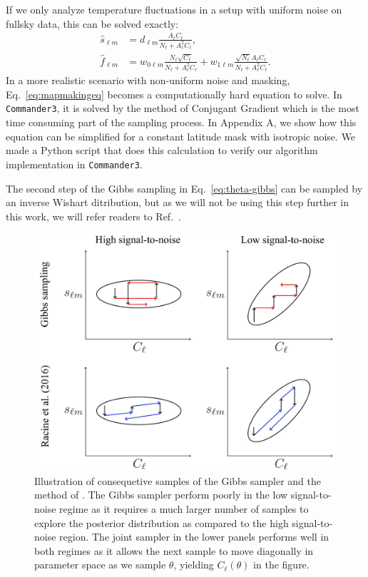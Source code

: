 \documentclass[twocolumn]{../common/aa}
\def\commanderthree{\texttt{Commander3}}
\begin{document}
If we only analyze temperature fluctuations in a setup with uniform noise on fullsky data, this can be solved exactly:
\begin{align}
    \hat{s}_{\ell m} &= d_{\ell m}\frac{A_{\ell}C_{\ell}}{N_\ell + A_{\ell}^2C_{\ell}},\\
    \hat{f}_{\ell m} &= w_{0\ell m}\frac{N_{\ell}\sqrt{C_{\ell}}}{N_\ell + A_{\ell}^2C_{\ell}}+w_{1\ell m}\frac{\sqrt{N_{\ell}}A_{\ell}C_\ell}{N_\ell + A_{\ell}^2C_{\ell}}.
\end{align}
In a more realistic scenario with non-uniform noise and masking, Eq.~\eqref{eq:mapmakingeq} becomes a computationally hard equation to solve. In \commanderthree, it is solved by the method of Conjugant Gradient which is the most time consuming part of the sampling process. In Appendix A, we show how this equation can be simplified for a constant latitude mask with isotropic noise. We made a Python script that does this calculation to verify our algorithm implementation in \commanderthree.

The second step of the Gibbs sampling in Eq.~\eqref{eq:theta-gibbs} can be sampled by an inverse Wishart ditribution, but as we will not be using this step further in this work, we will refer readers to Ref.~\cite{???}.

\begin{figure}
	\centering
	\includegraphics[width=\linewidth]{figures/parameter-estimation.jpg}
	\caption{\label{fig:illustration}Illustration of consequetive samples of the Gibbs sampler and the method of \cite{racine:2016}. The Gibbs sampler perform poorly in the low signal-to-noise regime as it requires a much larger number of samples to explore the posterior distribution as compared to the high signal-to-noise region. The joint sampler in the lower panels performs well in both regimes as it allows the next sample to move diagonally in parameter space as we sample $\theta$, yielding $C_\ell(\theta)$ in the figure.}
\end{figure}
\end{document}
